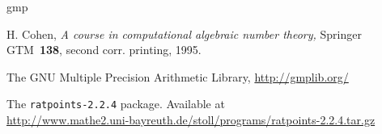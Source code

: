 \documentclass[12pt,a4paper,oneside]{amsart}
\newcommand{\rpversion}{2.2.4} %
\begin{document}

\begin{thebibliography}{gmp}
\frenchspacing

  H. Cohen, \textit{A course in computational algebraic number theory,}
  Springer GTM~\textbf{138}, second corr. printing, 1995.

  The GNU Multiple Precision Arithmetic Library, \url{http://gmplib.org/}

  The \texttt{ratpoints-\rpversion} package. Available at \\
  \url{http://www.mathe2.uni-bayreuth.de/stoll/programs/ratpoints-\rpversion.tar.gz}

\end{thebibliography}
\end{document}
